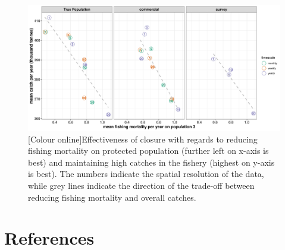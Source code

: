 \documentclass[preprint]{elsarticle}
\begin{document}
\begin{figure}[!ht]
	\centering
	\includegraphics[width =\linewidth]{./Plots/Closure_effectiveness_CF}
	\caption{[Colour online]Effectiveness of closure with regards to
		reducing fishing mortality on protected population (further
		left on x-axis is best) and maintaining high catches in the
		fishery (highest on y-axis is best). The numbers indicate the
		spatial resolution of the data, while grey lines indicate the
		direction of the trade-off between reducing fishing mortality
		and overall catches.}
	\label{fig:ce}
\end{figure}	





\clearpage

\section*{References}


\end{document}
